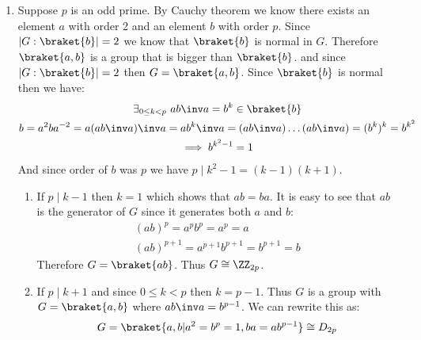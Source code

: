 \begin{enumerate}[label=]
    \item 
        Suppose $p$ is an odd prime. By Cauchy theorem we know there exists an element $a$ with order 2 and an element $b$ with order $p$. Since $|G:\braket{b}| = 2$ we know that $\braket{b }$ is normal in $G$. Therefore $\braket{a, b}$ is a group that is bigger than $\braket{b }$. and since $|G: \braket{b }| = 2$ then $G = \braket{a, b}$.
        Since $\braket{b }$ is normal then we have:
        \begin{gather*}
            \exists_{0 \le k < p} \ a b \inv a = b^k \in \braket{b}  \\
            b = a^2 b a^{-2} = a (a b \inv a) \inv a = a b^k \inv a = (a b \inv a) \dots (a b \inv a) = (b^k)^k = b^{k^2} \\
            \implies b^{k^2 - 1} = 1
        \end{gather*}
        And since order of $b$ was $p$ we have $p \mid k^2 - 1 = (k - 1)(k + 1)$. 
        \begin{enumerate}
            \item 
                If $p \mid k - 1$ then $k = 1$ which shows that $ab = ba$. It is easy to see that $ab$ is the generator of $G$ since it generates both $a$ and $b$:
                \begin{gather*}
                    (ab)^p = a^p b^p = a^p = a \\ 
                    (ab)^{p + 1} = a^{p + 1} b^{p + 1} = b^{p + 1} = b
                \end{gather*}
                Therefore $G = \braket{ab}$. Thus $G \cong \ZZ_{2p}$.
            \item 
                If $p \mid k + 1$ and since $0 \le k < p$ then $k = p - 1$.
                Thus $G$ is a group with $G = \braket{a, b}$ where $ab \inv a = b^{p- 1}$. We can rewrite this as:
                \begin{gather*}
                    G = \braket{a, b | a^2 = b^p = 1 , ba = ab^{p - 1} } \cong D_{2p}
                \end{gather*}
        \end{enumerate}
\end{enumerate}